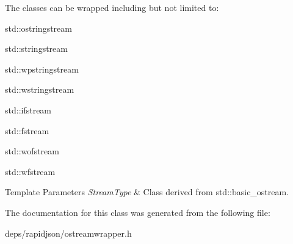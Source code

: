 The classes can be wrapped including but not limited to\+:


\begin{DoxyItemize}
\item {\ttfamily std\+::ostringstream} 
\item {\ttfamily std\+::stringstream} 
\item {\ttfamily std\+::wpstringstream} 
\item {\ttfamily std\+::wstringstream} 
\item {\ttfamily std\+::ifstream} 
\item {\ttfamily std\+::fstream} 
\item {\ttfamily std\+::wofstream} 
\item {\ttfamily std\+::wfstream} 
\end{DoxyItemize}


\begin{DoxyTemplParams}{Template Parameters}
{\em Stream\+Type} & Class derived from {\ttfamily std\+::basic\+\_\+ostream}. \\
\hline
\end{DoxyTemplParams}


The documentation for this class was generated from the following file\+:\begin{DoxyCompactItemize}
\item 
deps/rapidjson/ostreamwrapper.\+h\end{DoxyCompactItemize}
